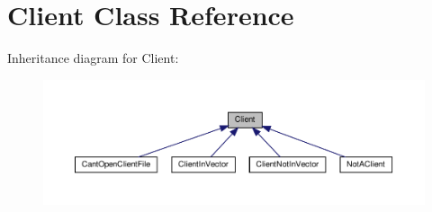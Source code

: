 \hypertarget{class_client}{}\section{Client Class Reference}
\label{class_client}


Inheritance diagram for Client\+:
\nopagebreak
\begin{figure}[H]
\begin{center}
\leavevmode
\includegraphics[width=350pt]{class_client__inherit__graph}
\end{center}
\end{figure}
